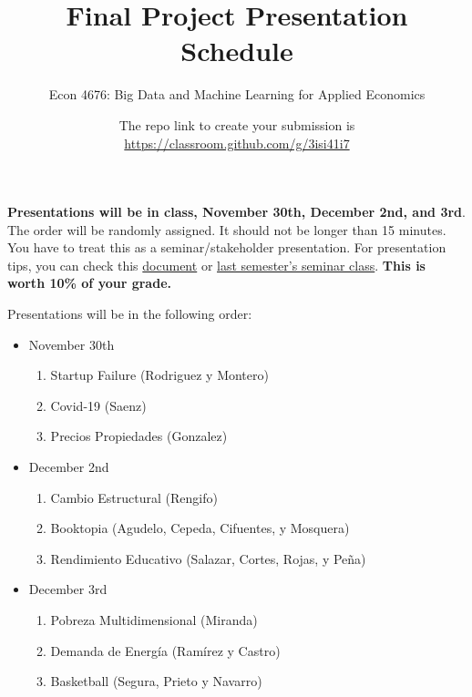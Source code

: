 \documentclass[12pt,onecolumn]{article}
\title{Final Project Presentation Schedule}
\subtitle{Econ 4676: Big Data and Machine Learning for Applied Economics}
\author{}
\date{The repo link to create your submission is \url{https://classroom.github.com/g/3isi41i7}}
\begin{document}
\maketitle


{\bf Presentations will be in class, November 30th, December 2nd, and 3rd}. The order will be randomly assigned. It should not be longer than 15 minutes. You have to treat this as a seminar/stakeholder presentation. For presentation tips, you can check this \href{https://ignaciomsarmiento.github.io/teaching/seminar/Tips_Presentation_PEG.pdf}{document} or  \href{https://ignaciomsarmiento.github.io/teaching/Tesis.html}{last semester's seminar class}. {\bf This is worth 10\% of your grade.}

Presentations will be in the following order:

\begin{itemize}
  \item November 30th
  \begin{enumerate}
      \item Startup Failure (Rodriguez y Montero)
      \item Covid-19 (Saenz)
      \item Precios Propiedades (Gonzalez)
    \end{enumerate}
    \item December 2nd
    \begin{enumerate}
      \item Cambio Estructural (Rengifo)
      \item Booktopia (Agudelo, Cepeda, Cifuentes, y Mosquera)
      \item Rendimiento Educativo (Salazar, Cortes, Rojas, y Peña)
      \end{enumerate}
      \item December 3rd
      \begin{enumerate}
        \item Pobreza Multidimensional (Miranda)
        \item Demanda de Energía (Ramírez y Castro)
        \item Basketball (Segura, Prieto y Navarro)
      \end{enumerate}
\end{itemize}

 
\end{document}
